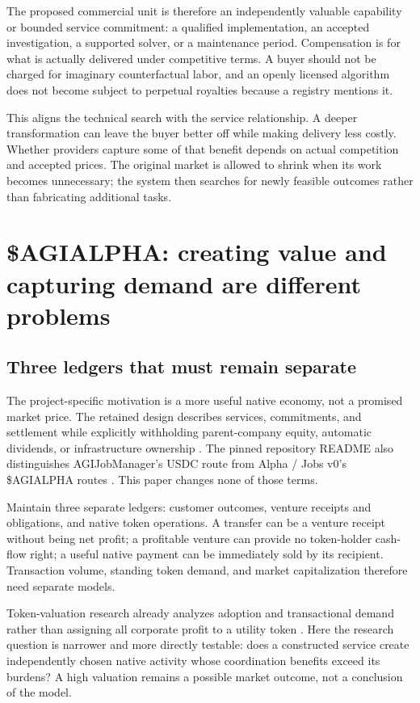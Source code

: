 \documentclass[11pt,letterpaper]{article}
\theoremstyle{remark}\newtheorem{remark}{Remark}[section]
\begin{document}
The proposed commercial unit is therefore an independently valuable capability or bounded service commitment: a qualified implementation, an accepted investigation, a supported solver, or a maintenance period. Compensation is for what is actually delivered under competitive terms. A buyer should not be charged for imaginary counterfactual labor, and an openly licensed algorithm does not become subject to perpetual royalties because a registry mentions it.

This aligns the technical search with the service relationship. A deeper transformation can leave the buyer better off while making delivery less costly. Whether providers capture some of that benefit depends on actual competition and accepted prices. The original market is allowed to shrink when its work becomes unnecessary; the system then searches for newly feasible outcomes rather than fabricating additional tasks.

\section{\texorpdfstring{\$AGIALPHA}{AGIALPHA}: creating value and capturing demand are different problems}
\label{sec:token}
\subsection{Three ledgers that must remain separate}
The project-specific motivation is a more useful native economy, not a promised market price. The retained design describes services, commitments, and settlement while explicitly withholding parent-company equity, automatic dividends, or infrastructure ownership \citep{capabilityDesign}. The pinned repository README also distinguishes AGIJobManager's USDC route from Alpha / Jobs v0's \$AGIALPHA routes \citep{alphaRepo}. This paper changes none of those terms.

Maintain three separate ledgers: customer outcomes, venture receipts and obligations, and native token operations. A transfer can be a venture receipt without being net profit; a profitable venture can provide no token-holder cash-flow right; a useful native payment can be immediately sold by its recipient. Transaction volume, standing token demand, and market capitalization therefore need separate models.

Token-valuation research already analyzes adoption and transactional demand rather than assigning all corporate profit to a utility token \citep{cong2021}. Here the research question is narrower and more directly testable: does a constructed service create independently chosen native activity whose coordination benefits exceed its burdens? A high valuation remains a possible market outcome, not a conclusion of the model.
\end{document}
